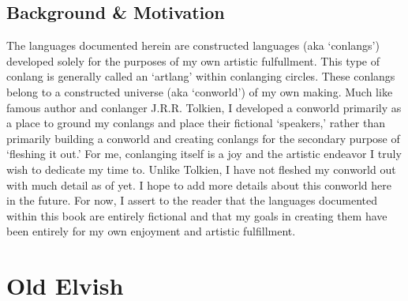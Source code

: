 \documentclass[a4paper,11pt,oneside,openany]{memoir}
\begin{document}
\begin{titlingpage}
\titleP
\end{titlingpage}
\frontmatter

\chapter{Background \& Motivation}

The languages documented herein are constructed languages (aka `conlangs') developed solely for the purposes of my own artistic fulfullment. This type of conlang is generally called an `artlang' within conlanging circles. These conlangs belong to a constructed universe (aka `conworld') of my own making. Much like famous author and conlanger J.R.R. Tolkien, I developed a conworld primarily as a place to ground my conlangs and place their fictional `speakers,' rather than primarily building a conworld and creating conlangs for the secondary purpose of `fleshing it out.' For me, conlanging itself is a joy and the artistic endeavor I truly wish to dedicate my time to. Unlike Tolkien, I have not fleshed my conworld out with much detail as of yet. I hope to add more details about this conworld here in the future. For now, I assert to the reader that the languages documented within this book are entirely fictional and that my goals in creating them have been entirely for my own enjoyment and artistic fulfillment.

\clearpage
\tableofcontents


\printnoidxglossary[type=\leipzigtype,title={Glossing Abbreviations}]

\mainmatter

\part{\parentlang{}}



\part{Old Elvish}



\backmatter


\end{document}

